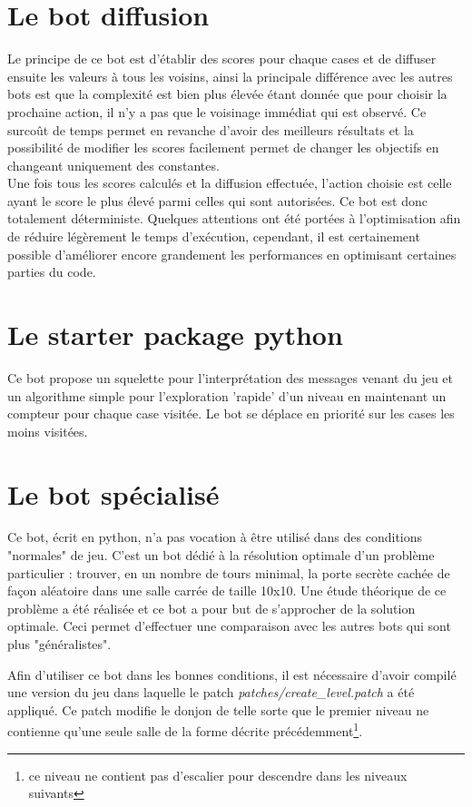 \documentclass[10pt,a4paper]{report}
\begin{document}
\section{Le bot diffusion}
Le principe de ce bot est d'établir des scores pour chaque cases et de diffuser
ensuite les valeurs à tous les voisins, ainsi la principale différence avec les
autres bots est que la complexité est bien plus élevée étant donnée que pour
choisir la prochaine action, il n'y a pas que le voisinage immédiat qui est
observé. Ce surcoût de temps permet en revanche d'avoir des meilleurs résultats
et la possibilité de modifier les scores facilement permet de changer les
objectifs en changeant uniquement des constantes.
\\
Une fois tous les scores calculés et la diffusion effectuée, l'action choisie
est celle ayant le score le plus élevé parmi celles qui sont autorisées. Ce bot
est donc totalement déterministe. Quelques attentions ont été portées à
l'optimisation afin de réduire légèrement le temps d'exécution, cependant, il
est certainement possible d'améliorer encore grandement les performances en
optimisant certaines parties du code.

\section{Le starter package python}

Ce bot propose un squelette pour l'interprétation des messages venant du jeu et un algorithme simple pour l'exploration 'rapide' d'un niveau en maintenant un compteur pour chaque case visitée. Le bot se déplace en priorité sur les cases les moins visitées.

\section{Le bot spécialisé}
Ce bot, écrit en python, n'a pas vocation à être utilisé dans des conditions
"normales" de jeu. C'est un bot dédié à la résolution optimale d'un problème
particulier : trouver, en un nombre de tours minimal, la porte secrète cachée
de façon aléatoire dans une salle carrée de taille 10x10. Une étude théorique
de ce problème a été réalisée et ce bot a pour but de s'approcher de la
solution optimale. Ceci permet d'effectuer une comparaison avec les autres
bots qui sont plus "généralistes".

Afin d'utiliser ce bot dans les bonnes conditions, il est nécessaire d'avoir
compilé une version du jeu dans laquelle le patch
\emph{patches/create\_level.patch} a été appliqué. Ce patch modifie le donjon
de telle sorte que le premier niveau ne contienne qu'une seule salle de la
forme décrite précédemment\footnote{ce niveau ne contient pas d'escalier pour descendre
dans les niveaux suivants}.
\end{document}
